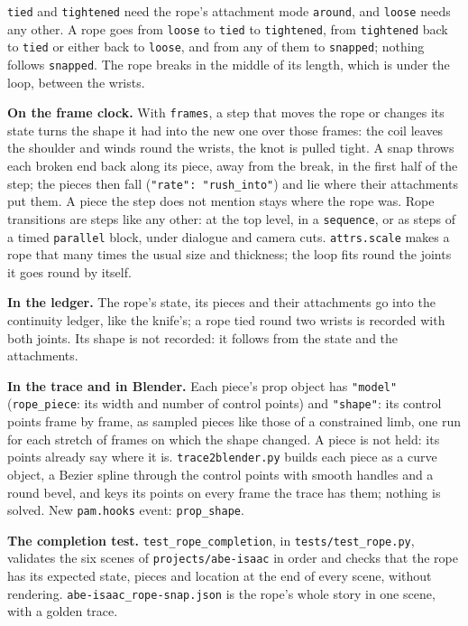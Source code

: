 \documentclass[
  12pt,
  letterpaper,
]{book}
\begin{document}
\texttt{tied} and \texttt{tightened} need the rope's attachment mode
\texttt{around}, and \texttt{loose} needs any other. A rope goes from
\texttt{loose} to \texttt{tied} to \texttt{tightened}, from
\texttt{tightened} back to \texttt{tied} or either back to
\texttt{loose}, and from any of them to \texttt{snapped}; nothing
follows \texttt{snapped}. The rope breaks in the middle of its length,
which is under the loop, between the wrists.

\textbf{On the frame clock.} With \texttt{frames}, a step that moves
the rope or changes its state turns the shape it had into the new one
over those frames: the coil leaves the shoulder and winds round the
wrists, the knot is pulled tight. A snap throws each broken end back
along its piece, away from the break, in the first half of the step;
the pieces then fall (\texttt{"rate": "rush\_into"}) and lie where
their attachments put them. A piece the step does not mention stays
where the rope was. Rope transitions are steps like any other: at the
top level, in a \texttt{sequence}, or as steps of a timed
\texttt{parallel} block, under dialogue and camera cuts.
\texttt{attrs.scale} makes a rope that many times the usual size and
thickness; the loop fits round the joints it goes round by itself.

\textbf{In the ledger.} The rope's state, its pieces and their
attachments go into the continuity ledger, like the knife's; a rope
tied round two wrists is recorded with both joints. Its shape is not
recorded: it follows from the state and the attachments.

\textbf{In the trace and in Blender.} Each piece's prop object has
\texttt{"model"} (\texttt{rope\_piece}: its width and number of
control points) and \texttt{"shape"}: its control points frame by
frame, as sampled pieces like those of a constrained limb, one run for
each stretch of frames on which the shape changed. A piece is not
held: its points already say where it is. \texttt{trace2blender.py}
builds each piece as a curve object, a Bezier spline through the
control points with smooth handles and a round bevel, and keys its
points on every frame the trace has them; nothing is solved. New
\texttt{pam.hooks} event: \texttt{prop\_shape}.

\textbf{The completion test.} \texttt{test\_rope\_completion}, in
\texttt{tests/test\_rope.py}, validates the six scenes of
\texttt{projects/abe-isaac} in order and checks that the rope has its
expected state, pieces and location at the end of every scene, without
rendering. \texttt{abe-isaac\_rope-snap.json} is the rope's whole
story in one scene, with a golden trace.
\end{document}
